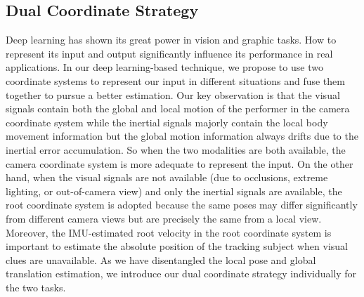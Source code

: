 \subsection{Dual Coordinate Strategy}\label{subsubsec:dual-coordinate}
%
Deep learning has shown its great power in vision and graphic tasks.
%
How to represent its input and output significantly influence its performance in real applications.
%
In our deep learning-based technique, we propose to use two coordinate systems to represent our input in different situations and fuse them together to pursue a better estimation.
%
Our key observation is that the visual signals contain both the global and local motion of the performer in the camera coordinate system while the inertial signals majorly contain the local body movement information but the global motion information always drifts due to the inertial error accumulation.
So when the two modalities are both available, the camera coordinate system is more adequate to represent the input.
%
On the other hand, when the visual signals are not available (due to occlusions, extreme lighting, or out-of-camera view) and only the inertial signals are available, the root coordinate system is adopted because the same poses may differ significantly from different camera views but are precisely the same from a local view.
%
Moreover, the IMU-estimated root velocity in the root coordinate system is important to estimate the absolute position of the tracking subject when visual clues are unavailable.
%
%
%
%
%
As we have disentangled the local pose and global translation estimation, we introduce our dual coordinate strategy individually for the two tasks.%
%
%
